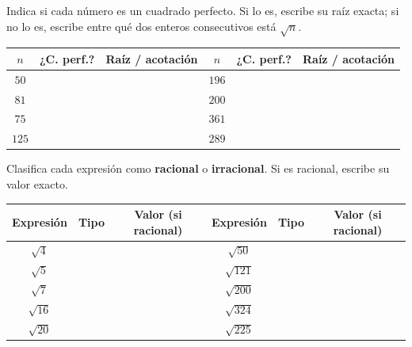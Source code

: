 \documentclass[11pt, letterpaper]{article}
\begin{document}
\vspace{6pt}

\begin{tcolorbox}[ejbasico,
  title={Ejercicio 3 \hfill $\bigstar$ \quad ¿Es cuadrado perfecto?}]

Indica si cada número es un cuadrado perfecto. Si lo es, escribe su raíz exacta; si no lo es, escribe entre qué dos enteros consecutivos está $\sqrt{n}$.

\medskip

\begin{center}
\renewcommand{\arraystretch}{1.9}
\begin{tabular}{|c|c|p{3.4cm}||c|c|p{3.4cm}|}
\hline
$n$ & \textbf{¿C. perf.?} & \textbf{Raíz / acotación} &
$n$ & \textbf{¿C. perf.?} & \textbf{Raíz / acotación}\\
\hline
$50$ & & & $196$ & &\\
\hline
$81$ & & & $200$ & &\\
\hline
$75$ & & & $361$ & &\\
\hline
$125$ & & & $289$ & &\\
\hline
\end{tabular}
\end{center}
\end{tcolorbox}

\clearpage

\begin{tcolorbox}[ejbasico,
  title={Ejercicio 4 \hfill $\bigstar$ \quad Racional o irracional}]

Clasifica cada expresión como \textbf{racional} o \textbf{irracional}. Si es racional, escribe su valor exacto.

\medskip

\begin{center}
\renewcommand{\arraystretch}{1.9}
\begin{tabular}{|c|c|c||c|c|c|}
\hline
\textbf{Expresión} & \textbf{Tipo} & \textbf{Valor (si racional)} &
\textbf{Expresión} & \textbf{Tipo} & \textbf{Valor (si racional)}\\
\hline
$\sqrt{4}$   & & & $\sqrt{50}$  & &\\
\hline
$\sqrt{5}$   & & & $\sqrt{121}$ & &\\
\hline
$\sqrt{7}$   & & & $\sqrt{200}$ & &\\
\hline
$\sqrt{16}$  & & & $\sqrt{324}$ & &\\
\hline
$\sqrt{20}$  & & & $\sqrt{225}$ & &\\
\hline
\end{tabular}
\end{center}
\end{tcolorbox}
\end{document}
